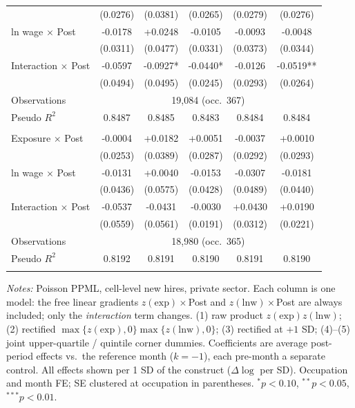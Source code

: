 \begin{table}[H]
\begin{tabular}{lccccc}
 & (0.0276) & (0.0381) & (0.0265) & (0.0279) & (0.0276) \\
ln wage $\times$ Post & -0.0178 & +0.0248 & -0.0105 & -0.0093 & -0.0048 \\
 & (0.0311) & (0.0477) & (0.0331) & (0.0373) & (0.0344) \\
Interaction $\times$ Post & -0.0597 & -0.0927* & -0.0440* & -0.0126 & -0.0519** \\
 & (0.0494) & (0.0495) & (0.0245) & (0.0293) & (0.0264) \\
\quad Observations & \multicolumn{5}{c}{19,084 \quad (occ.\ 367)} \\
\quad Pseudo $R^2$ & 0.8487 & 0.8485 & 0.8483 & 0.8484 & 0.8484 \\
\addlinespace
\multicolumn{6}{@{}l}{\textit{Panel: ages 51–60}} \\
Exposure $\times$ Post & -0.0004 & +0.0182 & +0.0051 & -0.0037 & +0.0010 \\
 & (0.0253) & (0.0389) & (0.0287) & (0.0292) & (0.0293) \\
ln wage $\times$ Post & -0.0131 & +0.0040 & -0.0153 & -0.0307 & -0.0181 \\
 & (0.0436) & (0.0575) & (0.0428) & (0.0489) & (0.0440) \\
Interaction $\times$ Post & -0.0537 & -0.0431 & -0.0030 & +0.0430 & +0.0190 \\
 & (0.0559) & (0.0561) & (0.0191) & (0.0312) & (0.0221) \\
\quad Observations & \multicolumn{5}{c}{18,980 \quad (occ.\ 365)} \\
\quad Pseudo $R^2$ & 0.8192 & 0.8191 & 0.8190 & 0.8191 & 0.8190 \\
\addlinespace
\bottomrule
\end{tabular}
\begin{minipage}{\linewidth}\vspace{2pt}\footnotesize
\emph{Notes:} Poisson PPML, cell-level new hires, private sector. Each column is one model: the free linear gradients $z(\text{exp})\times$Post and $z(\text{lnw})\times$Post are always included; only the \emph{interaction} term changes. (1) raw product $z(\text{exp})z(\text{lnw})$; (2) rectified $\max\{z(\text{exp}),0\}\max\{z(\text{lnw}),0\}$; (3) rectified at $+1$ SD; (4)--(5) joint upper-quartile / quintile corner dummies. Coefficients are average post-period effects vs.\ the reference month ($k{=}{-}1$), each pre-month a separate control. All effects shown per 1 SD of the construct ($\Delta\log$ per SD). Occupation and month FE; SE clustered at occupation in parentheses. $^{*}p<0.10$, $^{**}p<0.05$, $^{***}p<0.01$.
\end{minipage}
\end{table}